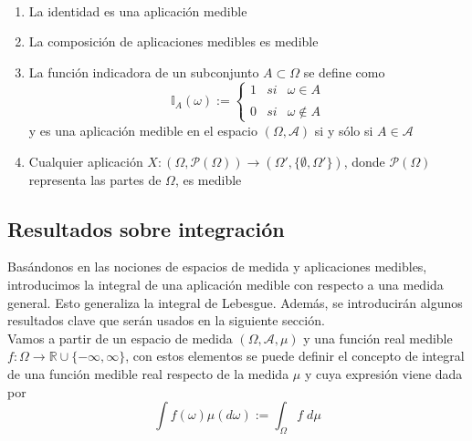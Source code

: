     \begin{ejemplo}~\smallskip
       \begin{enumerate}
       
            \item La identidad es una aplicación medible 
            \item La composición de aplicaciones medibles es medible
            \item La función indicadora de un subconjunto $A \subset \Omega$ se define como 
           $$ \mathbb{I}_{A}(\omega):= \left\{ \begin{array}{lcc} 1 & si & \omega\in A\\
           \\ 0 & si & \omega \notin A \end{array} \right. $$
           y es una aplicación medible en el espacio $(\Omega, \mathcal{A})$ si y sólo si $A \in \mathcal{A}$
           
           \item Cualquier aplicación $X:(\Omega,\mathcal{P}(\Omega))\to(\Omega',\{\emptyset, \Omega'\})$, donde $\mathcal{P}(\Omega)$ representa las partes de $\Omega$, es medible
       \end{enumerate}
     \end{ejemplo} 
       
      
     
\subsection{Resultados sobre integración}

    Basándonos en las nociones de espacios de medida y aplicaciones medibles, introducimos la integral de una aplicación medible con respecto a una medida general. Esto generaliza la integral de Lebesgue. Además, se introducirán algunos resultados clave que serán usados en la siguiente sección. \\ 

    Vamos a partir de un espacio de medida $(\Omega, \mathcal{A}, \mu)$ y una función real medible ${f:\Omega \to \mathbb{R} \cup \{-\infty,\infty\}}$, con estos elementos se puede definir el concepto de integral de una función medible real respecto de la medida $\mu$ y cuya expresión viene dada por
    $$\int f(\omega)\mu(d\omega) := \int_{\Omega} f \; d\mu$$ \\
    
